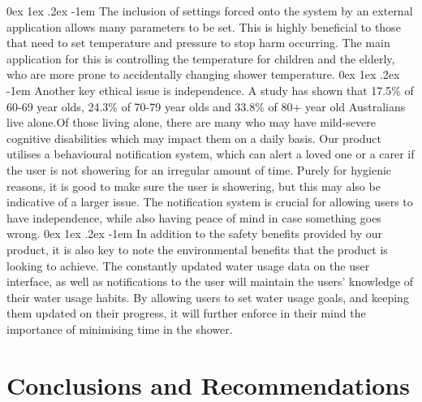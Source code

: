 \documentclass[12pt, a4paper]{article}
\makeatletter
\renewcommand\paragraph{\@startsection{paragraph}{5}{\parindent}%
  {0ex \@plus1ex \@minus.2ex}%
  {-1em}%
  {\normalfont\normalsize\bfseries}}
\makeatother
\begin{document}
            \paragraph{}
                The inclusion of settings forced onto the system by an external application allows many parameters to be set. This is highly beneficial to those that 
                need to set temperature and pressure to stop harm occurring. The main application for this is controlling the temperature for children and the elderly, 
                who are more prone to accidentally changing shower temperature.
            \paragraph{}
                Another key ethical issue is independence. A study has shown that 17.5\% of 60-69 year olds, 24.3\% of 70-79 year olds and 33.8\% of 80+ year old 
                Australians live alone\cite{living_alone}.Of those living alone, there are many who may have mild-severe cognitive disabilities which may impact them 
                on a daily basis. Our product utilises a behavioural notification system, which can alert a loved one or a carer if the user is not showering for an 
                irregular amount of time. Purely for hygienic reasons, it is good to make sure the user is showering, but this may also be indicative of a larger issue. 
                The notification system is crucial for allowing users to have independence, while also having peace of mind in case something goes wrong.
            \paragraph{}
                In addition to the safety benefits provided by our product, it is also key to note the environmental benefits that the product is looking to achieve. 
                The constantly updated water usage data on the user interface, as well as notifications to the user will maintain the users’ knowledge of their water 
                usage habits. By allowing users to set water usage goals, and keeping them updated on their progress, it will further enforce in their mind the 
                importance of minimising time in the shower.
        
    \newpage
    \section{Conclusions and Recommendations}
\end{document}

